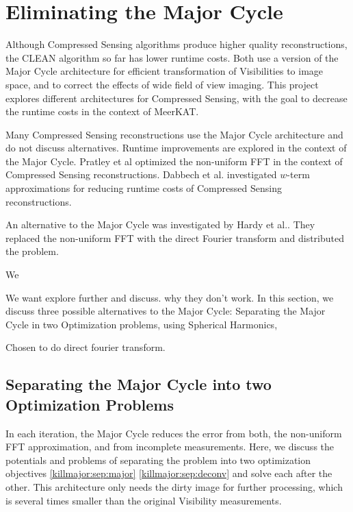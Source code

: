 \section{Eliminating the Major Cycle}\label{killmajor}
Although Compressed Sensing algorithms produce higher quality reconstructions, the CLEAN algorithm so far has lower runtime costs. Both use a version of the Major Cycle architecture for efficient transformation of Visibilities to image space, and to correct the effects of wide field of view imaging. This project explores different architectures for Compressed Sensing, with the goal to decrease the runtime costs in the context of MeerKAT.

Many Compressed Sensing reconstructions use the Major Cycle architecture\cite{girard2015sparse, dabbech2018cygnus, mcewen2011compressed, pratley2018fast}  and do not discuss alternatives. Runtime improvements are explored in the context of the Major Cycle. Pratley et al\cite{pratley2017robust} optimized the non-uniform FFT in the context of Compressed Sensing reconstructions. Dabbech et al.\cite{dabbech2017wEffect} investigated $w$-term approximations for reducing runtime costs of Compressed Sensing reconstructions. 

An alternative to the Major Cycle was investigated by Hardy et al.\cite{hardy2013direct}. They replaced the non-uniform FFT with the direct Fourier transform and distributed the problem.

We

We want explore further and discuss. why they don't work.
In this section, we discuss three possible alternatives to the Major Cycle: Separating the Major Cycle in two Optimization problems, using Spherical Harmonics,

Chosen to do direct fourier transform.



\subsection{Separating the Major Cycle into two Optimization Problems}
In each iteration, the Major Cycle reduces the error from both, the non-uniform FFT approximation, and from incomplete measurements. Here, we discuss the potentials and problems of separating the problem into two optimization objectives \eqref{killmajor:sep:major} \eqref{killmajor:sep:deconv} and solve each after the other. This architecture only needs the dirty image for further processing, which is several times smaller than the original Visibility measurements.

